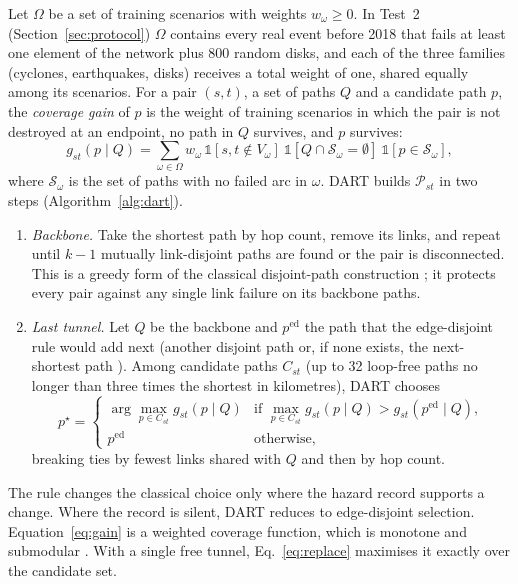 \documentclass[preprint,12pt]{elsarticle}
\begin{document}
Let $\Omega$ be a set of training scenarios with weights $w_\omega\ge 0$. In Test~2 (Section~\ref{sec:protocol}) $\Omega$ contains every real event before 2018 that fails at least one element of the network plus 800 random disks, and each of the three families (cyclones, earthquakes, disks) receives a total weight of one, shared equally among its scenarios. For a pair $(s,t)$, a set of paths $Q$ and a candidate path $p$, the \emph{coverage gain} of $p$ is the weight of training scenarios in which the pair is not destroyed at an endpoint, no path in $Q$ survives, and $p$ survives:
\begin{equation}
g_{st}(p\mid Q)=\sum_{\omega\in\Omega} w_\omega\,\mathbb{1}[s,t\notin V_\omega]\ \mathbb{1}[Q\cap\mathcal{S}_\omega=\emptyset]\ \mathbb{1}[p\in\mathcal{S}_\omega],
\label{eq:gain}
\end{equation}
where $\mathcal{S}_\omega$ is the set of paths with no failed arc in $\omega$. DART builds $\mathcal{P}_{st}$ in two steps (Algorithm~\ref{alg:dart}).
\begin{enumerate}
\item \emph{Backbone.} Take the shortest path by hop count, remove its links, and repeat until $k-1$ mutually link-disjoint paths are found or the pair is disconnected. This is a greedy form of the classical disjoint-path construction \cite{suurballe74}; it protects every pair against any single link failure on its backbone paths.
\item \emph{Last tunnel.} Let $Q$ be the backbone and $p^{\mathrm{ed}}$ the path that the edge-disjoint rule would add next (another disjoint path or, if none exists, the next-shortest path \cite{yen71}). Among candidate paths $C_{st}$ (up to 32 loop-free paths no longer than three times the shortest in kilometres), DART chooses
\begin{equation}
p^{\star}=\begin{cases}\arg\max_{p\in C_{st}} g_{st}(p\mid Q) & \text{if } \max_{p\in C_{st}} g_{st}(p\mid Q)>g_{st}(p^{\mathrm{ed}}\mid Q),\\ p^{\mathrm{ed}} & \text{otherwise,}\end{cases}
\label{eq:replace}
\end{equation}
breaking ties by fewest links shared with $Q$ and then by hop count.
\end{enumerate}
The rule changes the classical choice only where the hazard record supports a change. Where the record is silent, DART reduces to edge-disjoint selection. Equation~\eqref{eq:gain} is a weighted coverage function, which is monotone and submodular \cite{nemhauser78}. With a single free tunnel, Eq.~\eqref{eq:replace} maximises it exactly over the candidate set.
\end{document}
